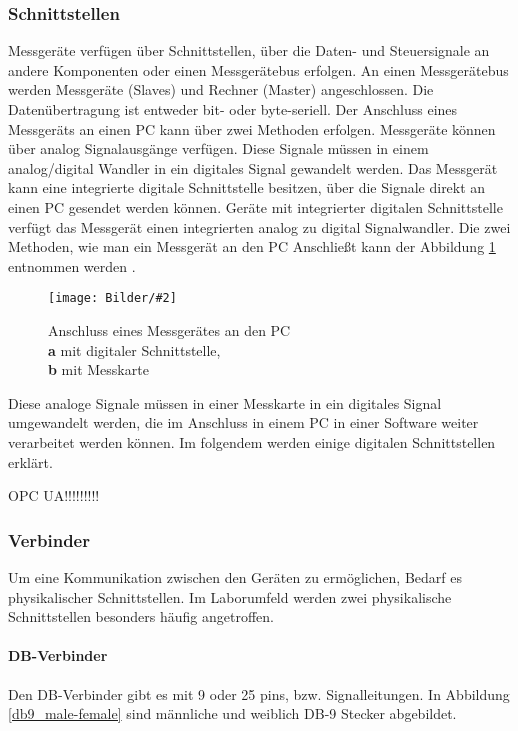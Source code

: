 \documentclass[
fontsize=12pt, 
paper=a4, 
BCOR=10mm, 
twoside=false,
 DIV=10, 
 headsepline, 
 footsepline
 ]{scrartcl}
\def\bild#1#2#3#4#5#6{%
\begin{figure}[h!] %
\centering
\texttt{[image: Bilder/\#2]}
\vspace{#3}
\caption[#4]{#5}\label{#6}
\end{figure}
}
\begin{document}
\subsubsection{Schnittstellen}

Messgeräte verfügen über Schnittstellen, über die Daten- und Steuersignale an andere Komponenten oder einen Messgerätebus erfolgen. An einen Messgerätebus werden Messgeräte (Slaves) und Rechner (Master) angeschlossen. Die Datenübertragung ist entweder bit- oder byte-seriell. Der Anschluss eines Messgeräts an einen PC kann über zwei Methoden erfolgen. Messgeräte können über analog Signalausgänge verfügen. Diese Signale müssen in einem analog/digital Wandler in ein digitales Signal gewandelt werden. Das Messgerät kann eine integrierte digitale Schnittstelle besitzen, über die Signale direkt an einen PC gesendet werden können. Geräte mit integrierter digitalen Schnittstelle verfügt das Messgerät einen integrierten analog zu digital Signalwandler.  Die zwei Methoden, wie man ein Messgerät an den PC Anschließt kann der Abbildung \ref{anschluss} entnommen werden \cite[S. 479]{Busch2015}.

\bild{1}
{anschluss.png}
{-1em}
{Digitale Schnittstelle oder über Messkarte}
{Anschluss eines Messgerätes an den PC \cite[S. 479]{Busch2015} 	\\ \textbf{a} mit digitaler Schnittstelle,\\ \textbf{b} mit Messkarte }
{anschluss}

Diese analoge Signale müssen in einer Messkarte in ein digitales Signal umgewandelt werden, die im Anschluss in einem PC in einer Software weiter verarbeitet werden können. Im folgendem werden einige digitalen Schnittstellen erklärt.

OPC UA!!!!!!!!!



\subsubsection{Verbinder}

Um eine Kommunikation zwischen den Geräten zu ermöglichen, Bedarf es physikalischer Schnittstellen. Im Laborumfeld werden zwei physikalische Schnittstellen besonders häufig angetroffen. 

\paragraph{DB-Verbinder} Den DB-Verbinder gibt es mit 9 oder 25 pins, bzw. Signalleitungen. In Abbildung \ref{db9_male-female} sind männliche und weiblich DB-9 Stecker abgebildet.
\end{document}
